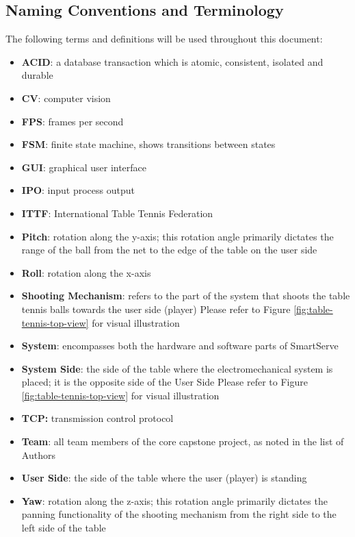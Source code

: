 \documentclass[11pt]{article}
\begin{document}
\subsection{Naming Conventions and Terminology}
\label{sec:definitions}
The following terms and definitions will be used throughout this document:
\begin{itemize}
\item \textbf{ACID}: a database transaction which is atomic, consistent, isolated and durable
\item \textbf{CV}: computer vision
\item \textbf{FPS}: frames per second
\item \textbf{FSM}: finite state machine, shows transitions between states
\item \textbf{GUI}: graphical user interface
\item \textbf{IPO}: input process output
\item \textbf{ITTF}: International Table Tennis Federation
\item \textbf{Pitch}: rotation along the y-axis; this rotation angle primarily dictates the range of the ball from the net to the edge of the table on the user side
\item \textbf{Roll}: rotation along the x-axis
\item \textbf{Shooting Mechanism}: refers to the part of the system that shoots the table tennis balls towards the user side (player) Please refer to Figure \ref{fig:table-tennis-top-view} for visual illustration
\item \textbf{System}: encompasses both the hardware and software parts of SmartServe
\item \textbf{System Side}: the side of the table where the electromechanical system is placed; it is the opposite side of the User Side Please refer to Figure \ref{fig:table-tennis-top-view} for visual illustration
\item \textbf{TCP:} transmission control protocol
\item \textbf{Team}: all team members of the core capstone project, as noted in the list of Authors
\item \textbf{User Side}: the side of the table where the user (player) is standing
\item \textbf{Yaw}: rotation along the z-axis; this rotation angle primarily dictates the panning functionality of the shooting mechanism from the right side to the left side of the table
\end{itemize}
\end{document}
